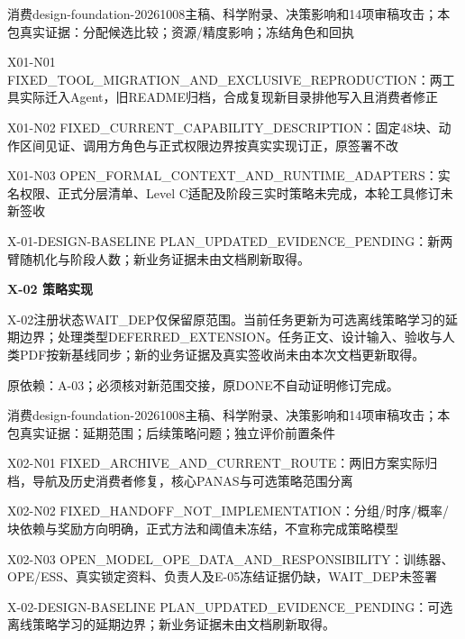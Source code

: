 \documentclass[11pt,a4paper]{article}
\newcommand{\reviewsection}[1]{\par\Needspace{5\baselineskip}\vspace{10pt}\begin{center}{\titlelatin\titlecjk\bfseries\fontsize{14}{20}\selectfont #1}\end{center}}
\begin{document}
消费design-\allowbreak{}foundation-\allowbreak{}20261008主稿、科学附录、决策影响和14项审稿攻击；本包真实证据：分配候选比较；资源/\allowbreak{}精度影响；冻结角色和回执


X01-\allowbreak{}N01 FIXED\_\allowbreak{}TOOL\_\allowbreak{}MIGRATION\_\allowbreak{}AND\_\allowbreak{}EXCLUSIVE\_\allowbreak{}REPRODUCTION：两工具实际迁入Agent，旧README归档，合成复现新目录排他写入且消费者修正


X01-\allowbreak{}N02 FIXED\_\allowbreak{}CURRENT\_\allowbreak{}CAPABILITY\_\allowbreak{}DESCRIPTION：固定48块、动作区间见证、调用方角色与正式权限边界按真实实现订正，原签署不改


X01-\allowbreak{}N03 OPEN\_\allowbreak{}FORMAL\_\allowbreak{}CONTEXT\_\allowbreak{}AND\_\allowbreak{}RUNTIME\_\allowbreak{}ADAPTERS：实名权限、正式分层清单、Level C适配及阶段三实时策略未完成，本轮工具修订未新签收


X-\allowbreak{}01-\allowbreak{}DESIGN-\allowbreak{}BASELINE PLAN\_\allowbreak{}UPDATED\_\allowbreak{}EVIDENCE\_\allowbreak{}PENDING：新两臂随机化与阶段人数；新业务证据未由文档刷新取得。


\reviewsection{X-\allowbreak{}02 策略实现}
X-\allowbreak{}02注册状态WAIT\_\allowbreak{}DEP仅保留原范围。当前任务更新为可选离线策略学习的延期边界；处理类型DEFERRED\_\allowbreak{}EXTENSION。任务正文、设计输入、验收与人类PDF按新基线同步；新的业务证据及真实签收尚未由本次文档更新取得。


原依赖：A-\allowbreak{}03；必须核对新范围交接，原DONE不自动证明修订完成。


消费design-\allowbreak{}foundation-\allowbreak{}20261008主稿、科学附录、决策影响和14项审稿攻击；本包真实证据：延期范围；后续策略问题；独立评价前置条件


X02-\allowbreak{}N01 FIXED\_\allowbreak{}ARCHIVE\_\allowbreak{}AND\_\allowbreak{}CURRENT\_\allowbreak{}ROUTE：两旧方案实际归档，导航及历史消费者修复，核心PANAS与可选策略范围分离


X02-\allowbreak{}N02 FIXED\_\allowbreak{}HANDOFF\_\allowbreak{}NOT\_\allowbreak{}IMPLEMENTATION：分组/\allowbreak{}时序/\allowbreak{}概率/\allowbreak{}块依赖与奖励方向明确，正式方法和阈值未冻结，不宣称完成策略模型


X02-\allowbreak{}N03 OPEN\_\allowbreak{}MODEL\_\allowbreak{}OPE\_\allowbreak{}DATA\_\allowbreak{}AND\_\allowbreak{}RESPONSIBILITY：训练器、OPE/\allowbreak{}ESS、真实锁定资料、负责人及E-\allowbreak{}05冻结证据仍缺，WAIT\_\allowbreak{}DEP未签署


X-\allowbreak{}02-\allowbreak{}DESIGN-\allowbreak{}BASELINE PLAN\_\allowbreak{}UPDATED\_\allowbreak{}EVIDENCE\_\allowbreak{}PENDING：可选离线策略学习的延期边界；新业务证据未由文档刷新取得。
\end{document}
